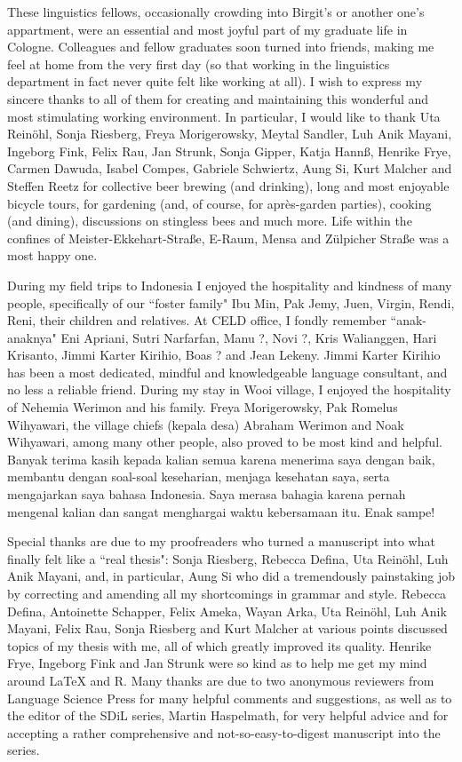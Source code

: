 \begin{refsection}
These linguistics fellows, occasionally crowding into Birgit's or another one's appartment, were an essential and most joyful part of my graduate life in Cologne. Colleagues and fellow graduates soon turned into friends, making me feel at home from the very first day (so that working in the linguistics department in fact never quite felt like working at all). I wish to express my sincere thanks to all of them for creating and maintaining this wonderful and most stimulating working environment. In particular, I would like to thank Uta Reinöhl, Sonja Riesberg, Freya Morigerowsky, Meytal Sandler, Luh Anik Mayani, Ingeborg Fink, Felix Rau, Jan Strunk, Sonja Gipper, Katja Hannß, Henrike Frye, Carmen Dawuda, Isabel Compes, Gabriele Schwiertz, Aung Si, Kurt Malcher and Steffen Reetz for collective beer brewing (and drinking), long and most enjoyable bicycle tours, for gardening (and, of course, for après-garden parties), cooking (and dining), discussions on stingless bees and much more. Life within the confines of Meister-Ekkehart-Straße, E-Raum, Mensa and Zülpicher Straße was a most happy one.

During my field trips to Indonesia I enjoyed the hospitality and kindness of many people, specifically of our ``foster family" Ibu Min, Pak Jemy, Juen, Virgin, Rendi, Reni, their children and relatives. At CELD office, I fondly remember ``anak-anaknya" Eni Apriani, Sutri Narfarfan, Manu ?, Novi ?, Kris Walianggen, Hari Krisanto, Jimmi Karter Kirihio, Boas ? and Jean Lekeny. Jimmi Karter Kirihio has been a most dedicated, mindful and knowledgeable language consultant, and no less a reliable friend. During my stay in Wooi village, I enjoyed the hospitality of Nehemia Werimon and his family. Freya Morigerowsky, Pak Romelus Wihyawari, the village chiefs (kepala desa) Abraham Werimon and Noak Wihyawari, among many other people, also proved to be most kind and helpful. Banyak terima kasih kepada kalian semua karena menerima saya dengan baik, membantu dengan soal-soal keseharian, menjaga kesehatan saya, serta mengajarkan saya bahasa Indonesia. Saya merasa bahagia karena pernah mengenal kalian dan sangat menghargai waktu kebersamaan itu. Enak sampe!

Special thanks are due to my proofreaders who turned a manuscript into what finally felt like a ``real thesis": Sonja Riesberg, Rebecca Defina, Uta Reinöhl, Luh Anik Mayani, and, in particular, Aung Si who did a tremendously painstaking job by correcting and amending all my shortcomings in grammar and style. Rebecca Defina, Antoinette Schapper, Felix Ameka, Wayan Arka, Uta Reinöhl, Luh Anik Mayani, Felix Rau, Sonja Riesberg and Kurt Malcher at various points discussed topics of my thesis with me, all of which greatly improved its quality. Henrike Frye, Ingeborg Fink and Jan Strunk were so kind as to help me get my mind around LaTeX and R. Many thanks are due to two anonymous reviewers from Language Science Press for many helpful comments and suggestions, as well as to the editor of the SDiL series, Martin Haspelmath, for very helpful advice and for accepting a rather comprehensive and not-so-easy-to-digest manuscript into the series.


\end{refsection}
